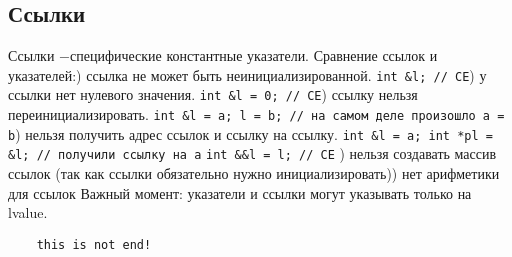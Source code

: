 \documentclass[15pt, a4paper]{article}
\newcommand{\nl}{\newline}
\begin{document}
  \subsection{Ссылки}
  Ссылки $-$специфические константные указатели.\nl
  Сравнение ссылок и указателей:\nl
  1) ссылка не может быть неинициализированной. \nl \texttt{int \&l; // CE}\nl
  2) у ссылки нет нулевого значения. \nl \texttt{int \&l = 0; // CE}\nl
  3) ссылку нельзя переинициализировать. \nl \texttt{int \&l = a; l = b; // на самом деле произошло a = b}\nl
  4) нельзя получить адрес ссылок и ссылку на ссылку. \nl \texttt {int \&l = a; int *pl = \&l; // получили ссылку на a} 
  \nl \texttt{int \&\&l = l; // CE} \nl
  5) нельзя создавать массив ссылок (так как ссылки обязательно нужно инициализировать)\nl
  6) нет арифметики для ссылок\nl
  Важный момент: указатели и ссылки могут указывать только на lvalue.\nl
  \begin{verbatim}
    this is not end!
  \end{verbatim}
\end{document}

